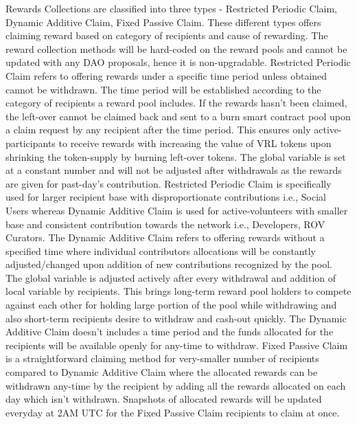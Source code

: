 \documentclass[conference]{IEEEtran}
\begin{document}
Rewards Collections are classified into three types - Restricted Periodic Claim,  Dynamic Additive Claim, Fixed Passive Claim. These different types offers claiming reward based on category of recipients and cause of rewarding. The reward collection methods will be hard-coded on the reward pools and cannot be updated with any DAO proposals, hence it is non-upgradable. Restricted Periodic Claim refers to offering rewards under a specific time period unless obtained cannot be withdrawn. The time period will be established according to the category of recipients a reward pool includes. If the rewards hasn't been claimed, the left-over cannot be claimed back and sent to a burn smart contract pool upon a claim request by any recipient after the time period. This ensures only active-participants to receive rewards with increasing the value of VRL tokens upon shrinking the token-supply by burning left-over tokens. The global variable is set at a constant number and will not be adjusted after withdrawals as the rewards are given for past-day's contribution. Restricted Periodic Claim is specifically used for larger recipient base with disproportionate contributions i.e., Social Users whereas Dynamic Additive Claim is used for active-volunteers with smaller base and consistent contribution towards the network i.e., Developers, ROV Curators. The Dynamic Additive Claim refers to offering rewards without a specified time where individual contributors allocations will be constantly adjusted/changed upon addition of new contributions recognized by the pool. The global variable is adjusted actively after every withdrawal and addition of local variable by recipients. This brings long-term reward pool holders to compete against each other for holding large portion of the pool while withdrawing and also short-term recipients desire to withdraw and cash-out quickly. The Dynamic Additive Claim doesn't includes a time period and the funds allocated for the recipients will be available openly for any-time to withdraw. Fixed Passive Claim is a straightforward claiming method for very-smaller number of recipients compared to Dynamic Additive Claim where the allocated rewards can be withdrawn any-time by the recipient by adding all the rewards allocated on each day which isn't withdrawn. Snapshots of allocated rewards will be updated everyday at 2AM UTC for the Fixed Passive Claim recipients to claim at once.\\
\end{document}
